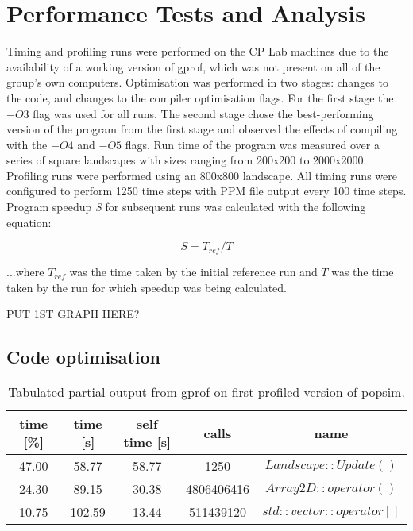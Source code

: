 \section{Performance Tests and Analysis}
\label{Performance Tests and Analysis}

Timing and profiling runs were performed on the CP Lab machines due to the availability of a working version of gprof, which was not present on all of the group's own computers.
Optimisation was performed in two stages: changes to the code, and changes to the compiler optimisation flags.  For the first stage the $-O3$ flag was used for all runs.  The second stage chose the best-performing version of the program from the first stage and observed the effects of compiling with the $-O4$ and $-O5$ flags.
Run time of the program was measured over a series of square landscapes with sizes ranging from 200x200 to 2000x2000.
Profiling runs were performed using an 800x800 landscape.
All timing runs were configured to perform 1250 time steps with PPM file output every 100 time steps.
Program speedup \textit{S} for subsequent runs was calculated with the following equation:

\begin{equation} 
S = T_{ref} / T 
\label{equation:speedup}
\end{equation}

...where $T_{ref}$  was the time taken by the initial reference run and ${T}$ was the time taken by the run for which speedup was being calculated.


PUT 1ST GRAPH HERE?


\subsection{Code optimisation}
\label{Code optimisation}

\begin{table}[h!]
\caption{Tabulated partial output from gprof on first profiled version of popsim.}
\label{tab:profile1}
\begin{center}
\begin{tabular}{|c|c|c|c|c|}
\hline
time [\%] & time [s] & self time [s] & calls & name\\
\hline
47.00 & 58.77 & 58.77 & 1250 & $Landscape::Update()$\\
\hline
24.30 & 89.15 & 30.38& 4806406416 & $Array2D::operator()$\\
\hline
10.75& 102.59 & 13.44 & 511439120 & $std::vector::operator[]$\\
\hline
\end{tabular}
\end{center}
\end{table}

